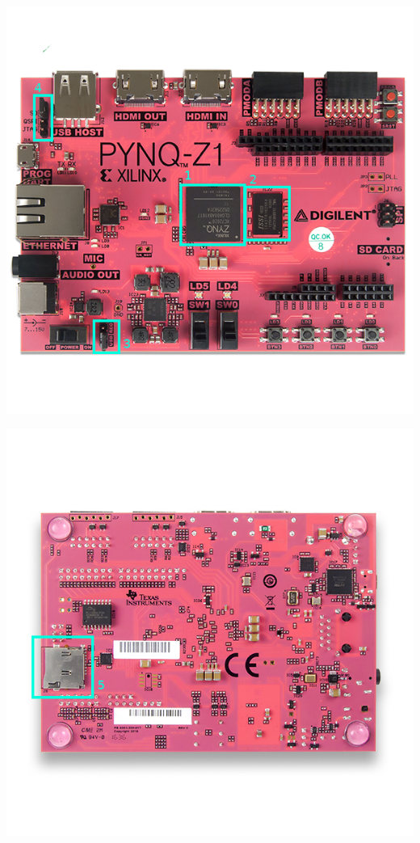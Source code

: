 \documentclass[11pt]{article}
\begin{document}
\begin{minipage}[h]{0.5\textwidth}
    \includegraphics[width=\textwidth]{figs/z1_top_annotated.png}
\end{minipage}
\begin{minipage}[h]{0.5\textwidth}
    \includegraphics[width=\textwidth]{figs/z1_bottom_annotated.png}
\end{minipage}
\end{document}
